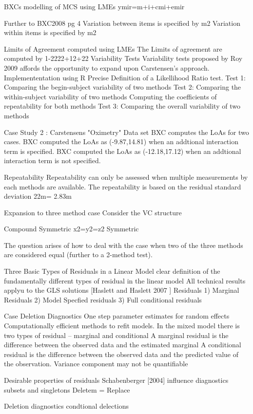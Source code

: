 BXCs modelling of MCS using LMEs
ymir=m+i+cmi+emir
 
Further to BXC2008 pg 4
Variation between items is  specified by m2
Variation within items is  specified by m2
 
Limits of Agreement computed using LMEs
The Limits of agreement are computed by 1-2222+12+22
Variability Tests
Variability tests proposed by Roy 2009 affords the opportunity to expand upon Carstensen's approach.
Implemententation using R
Precise Definition of a Likellihood Ratio test.
Test 1: Comparing the begin-subject variability of two methods
Test 2: Comparing the within-subject variability of two methods
Computing the coefficients of repeatability for both methods
Test 3: Comparing the overall variability of two methods 
 
Case Study 2 : Carstensens "Oximetry" Data set
BXC computes the LoAs for two cases.
BXC computed the LoAs as (-9.87,14.81) when an addtional interaction term is specified.
BXC computed the LoAs as (-12.18,17.12) when an addtional interaction term is not specified.
 
Repeatability
Repeatability can only be assessed when multiple measurements by each methods are available.
The repeatability is based on the residual standard deviation 22m= 2.83m
 
Expansion to three method case
Consider the VC structure
 
Compound Symmetric     	x2=y2=z2
Symmetric                        
 
The question arises of how to deal with the case when two of the three methods are considered equal (further to a 2-method test). 

Three Basic Types of Residuals in a Linear Model
clear definition of the fundamentally different types of residual in the linear model
All technical results applyu to the GLS solutions
[Haslett and Haslett 2007 ]
Residuals
1) Marginal Residuals
2) Model Specfied residuals
3) Full conditional residuals

Case Deletion Diagnostics
One step parameter estimates for random effects
Computationally efficient methods to refit models.
In the mixed model there is two types of residual – marginal and conditional
A marginal residual is the difference between the observed data and the estimated marginal
A conditional residual is the difference between the observed data and the predicted value of the observation.
Variance component may not be quantifiable

Desirable properties of residuals
Schabenberger [2004] influence diagnostics
subsets and singletons
Deletem = Replace

Deletion diagnostics
condtional delections


 
 
